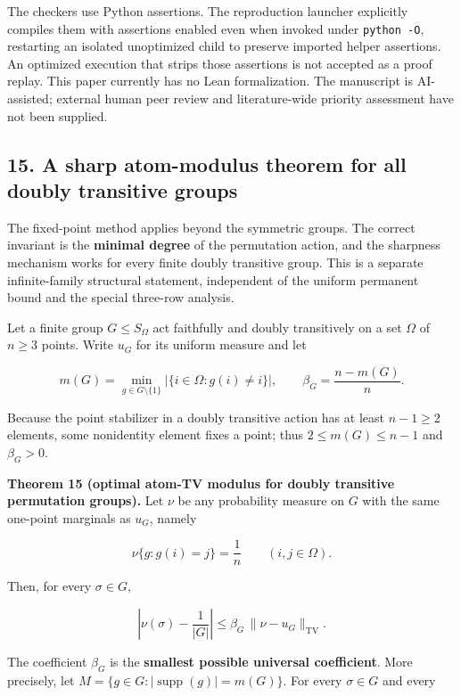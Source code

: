 \documentclass[
  11pt,
]{article}
\begin{document}
The checkers use Python assertions. The reproduction launcher explicitly
compiles them with assertions enabled even when invoked under
\texttt{python\ -O}, restarting an isolated unoptimized child to
preserve imported helper assertions. An optimized execution that strips
those assertions is not accepted as a proof replay. This paper currently
has no Lean formalization. The manuscript is AI-assisted; external human
peer review and literature-wide priority assessment have not been
supplied.

\subsection{15. A sharp atom-modulus theorem for all doubly transitive
groups}\label{a-sharp-atom-modulus-theorem-for-all-doubly-transitive-groups}

The fixed-point method applies beyond the symmetric groups. The correct
invariant is the \textbf{minimal degree} of the permutation action, and
the sharpness mechanism works for every finite doubly transitive group.
This is a separate infinite-family structural statement, independent of
the uniform permanent bound and the special three-row analysis.

Let a finite group \(G\le S_\Omega\) act faithfully and doubly
transitively on a set \(\Omega\) of \(n\ge3\) points. Write \(u_G\) for
its uniform measure and let

\[
m(G)=\min_{g\in G\setminus\{1\}}
\big|\{i\in\Omega:g(i)\ne i\}\big|,
\qquad \beta_G=\frac{n-m(G)}n. \tag{54}
\]

Because the point stabilizer in a doubly transitive action has at least
\(n-1\ge2\) elements, some nonidentity element fixes a point; thus
\(2\le m(G)\le n-1\) and \(\beta_G>0\).

\textbf{Theorem 15 (optimal atom-TV modulus for doubly transitive
permutation groups).} Let \(\nu\) be any probability measure on \(G\)
with the same one-point marginals as \(u_G\), namely

\[
\nu\{g:g(i)=j\}=\frac1n \qquad(i,j\in\Omega).
\]

Then, for every \(\sigma\in G\),

\[
\boxed{\left|\nu(\sigma)-\frac1{|G|}\right|
\le\beta_G\,\|\nu-u_G\|_{\mathrm{TV}}.} \tag{55}
\]

The coefficient \(\beta_G\) is the \textbf{smallest possible universal
coefficient}. More precisely, let
\(M=\{g\in G:|\operatorname{supp}(g)|=m(G)\}\). For every
\(\sigma\in G\) and every
\end{document}
